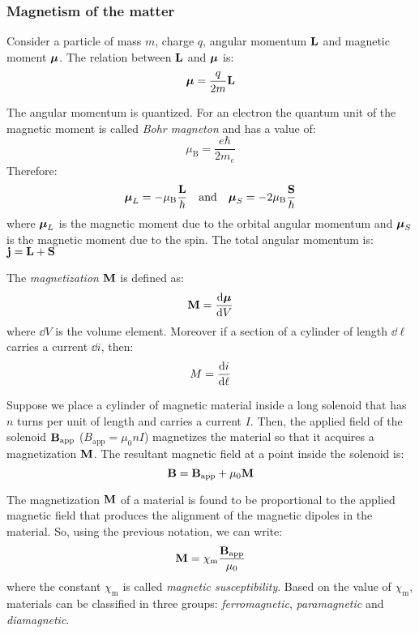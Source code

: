 \documentclass[../../../main.tex]{subfiles}
\begin{document}
\begin{multicols}{2}
    \subsubsection{Magnetism of the matter}
    \begin{prop}
        Consider a particle of mass $m$, charge $q$, angular momentum $\boldsymbol{\mathrm{L}}$ and magnetic moment $\boldsymbol{\mathrm{\mu}}$. The relation between $\boldsymbol{\mathrm{L}}$ and $\boldsymbol{\mathrm{\mu}}$ is: $$\boldsymbol{\mathrm{\mu}}=\frac{q}{2m}\boldsymbol{\mathrm{L}}$$
    \end{prop}
    \begin{prop}
        The angular momentum is quantized. For an electron the quantum unit of the magnetic moment is called \textit{Bohr magneton} and has a value of: $$\mu_\text{B}=\frac{e\hbar}{2m_e}$$ Therefore: $$\boldsymbol{\mathrm{\mu}}_L=-\mu_\text{B}\frac{\boldsymbol{\mathrm{L}}}{\hbar}\quad\text{and}\quad\boldsymbol{\mathrm{\mu}}_S=-2\mu_\text{B}\frac{\boldsymbol{\mathrm{S}}}{\hbar}$$ where $\boldsymbol{\mathrm{\mu}}_L$ is the magnetic moment due to the orbital angular momentum and $\boldsymbol{\mathrm{\mu}}_S$ is the magnetic moment due to the spin. The total angular momentum is: $\boldsymbol{\mathrm{j}}=\boldsymbol{\mathrm{L}}+\boldsymbol{\mathrm{S}}$
    \end{prop}
    \begin{definition}
        The \textit{magnetization $\boldsymbol{\mathrm{M}}$} is defined as: $$\boldsymbol{\mathrm{M}}=\dv{\boldsymbol{\mathrm{\mu}}}{V}$$ where $\dd V$ is the volume element. Moreover if a section of a cylinder of length $\dd\ell$ carries a current $\dd i$, then: $$M=\dv{i}{\ell}$$
    \end{definition}
    \begin{prop}
        Suppose we place a cylinder of magnetic material inside a long solenoid that has $n$ turns per unit of length and carries a current $I$. Then, the applied field of the solenoid $\boldsymbol{\mathrm{B}}_\text{app}$ ($B_\text{app}=\mu_0nI$) magnetizes the material so that it acquires a magnetization $\boldsymbol{\mathrm{M}}$. The resultant magnetic field at a point inside the solenoid is: $$\boldsymbol{\mathrm{B}}=\boldsymbol{\mathrm{B}}_\text{app}+\mu_0\boldsymbol{\mathrm{M}}$$
    \end{prop}
    \begin{prop}
        The magnetization $\boldsymbol{\mathrm{M}}$ of a material is found to be proportional to the applied magnetic field that produces the alignment of the magnetic dipoles in the material. So, using the previous notation, we can write: $$\boldsymbol{\mathrm{M}}=\chi_\text{m}\frac{\boldsymbol{\mathrm{B}}_\text{app}}{\mu_0}$$ where the constant $\chi_\text{m}$ is called \textit{magnetic susceptibility}. Based on the value of $\chi_\text{m}$, materials can be classified in three groups: \textit{ferromagnetic}, \textit{paramagnetic} and \textit{diamagnetic}.
        \begin{center}

\end{center}
\end{prop}
\end{multicols}
\end{document}
